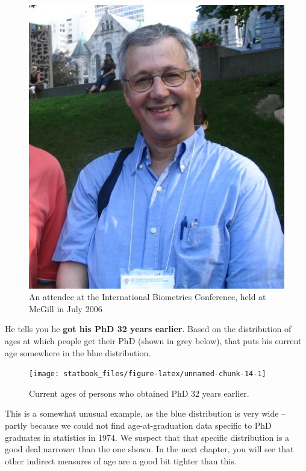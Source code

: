 \documentclass[]{book}
\begin{document}
\begin{figure}

{\centering \includegraphics[width=9.51in]{images/IMG_DS} 

}

\caption{An attendee at the International Biometrics Conference, held at McGill in July 2006}\label{fig:unnamed-chunk-13}
\end{figure}

He tells you he \textbf{got his PhD 32 years earlier}. Based on the distribution of ages at which people get their PhD (shown in grey below), that puts his current age somewhere in the blue distribution.

\begin{figure}

{\centering \texttt{[image: statbook\_files/figure-latex/unnamed-chunk-14-1]} 

}

\caption{Current ages of persons who obtained PhD 32 years earlier.}\label{fig:unnamed-chunk-14}
\end{figure}

This is a somewhat unusual example, as the blue distribution is very wide -- partly because we could not find age-at-graduation data specific to PhD graduates in statistics in 1974. We suspect that that specific distribution is a good deal narrower than the one shown. In the next chapter, you will see that other indirect measures of age are a good bit tighter than this.
\end{document}
